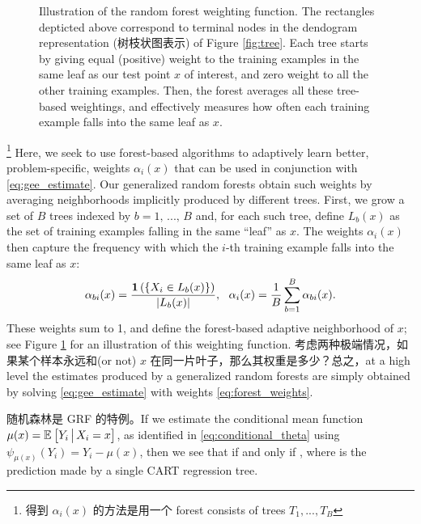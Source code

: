 \documentclass[aos]{imsart}
\theoremstyle{plain}
\theoremstyle{definition}
\theoremstyle{remark}
\begin{document}
\begin{CJK}{UTF8}{gbsn}
\begin{figure}
\begin{center}
\begin{tabular}{cc}
\end{tabular}
\end{center}
\caption{Illustration of the random forest weighting function. The rectangles depticted above correspond to terminal nodes in the dendogram representation (树枝状图表示) of Figure \ref{fig:tree}. Each tree starts by giving equal (positive) weight to the training examples in the same leaf as our test point $x$ of interest, and zero weight to all the other training examples. Then, the forest averages all these tree-based weightings, and effectively measures how often each training example falls into the same leaf as $x$.}
\label{fig:weighting}
\vspace{-1.5\baselineskip}
\end{figure}




\footnote{得到 $\alpha_i(x)$ 的方法是用一个 forest consists of trees $T_1, ..., T_B$} Here, we seek to use forest-based algorithms to adaptively learn better, problem-specific,
weights $\alpha_i(x)$ that can be used in conjunction with \eqref{eq:gee_estimate}.
Our generalized random forests obtain such weights
by averaging neighborhoods implicitly produced by different trees. First, we grow a set of $B$ trees indexed by $b = 1, \, ..., \, B$ and, for each such tree, define $L_b(x)$
as the set of training examples falling in the same ``leaf'' as $x$. The weights $\alpha_i(x)$ then
capture the frequency with which the $i$-th training example falls into the same leaf as $x$:
\begin{equation}
\label{eq:forest_weights}
\alpha_{bi}(x) = \frac{\1\p{\cb{X_i \in L_b(x)}}}{\abs{L_b(x)}}, \ \ \alpha_i(x) = \frac{1}{B} \sum_{b = 1}^B \alpha_{bi}(x).
\end{equation}
These weights sum to 1, and define the forest-based adaptive neighborhood of $x$; see Figure \ref{fig:weighting} for an illustration of this weighting function. 考虑两种极端情况，如果某个样本永远和(or not) $x$ 在同一片叶子，那么其权重是多少？总之，at a high level the estimates  produced by a generalized random forests are simply obtained by solving \eqref{eq:gee_estimate} with weights \eqref{eq:forest_weights}.

随机森林是 GRF 的特例。If we estimate the conditional mean function $\mu(x) = \mathbb{E}_{}\left[Y_i \,\big|\, X_i = x\right]$, as
identified in \eqref{eq:conditional_theta} using
$\psi_{\mu(x)}(Y_i) = Y_i - \mu(x)$, then we see that
if and only if
,
where  is the
prediction made by a single CART regression tree.


\end{CJK}
\end{document}
